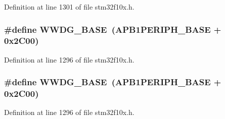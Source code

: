 Definition at line 1301 of file stm32f10x.\+h.

\subsubsection[{\texorpdfstring{W\+W\+D\+G\+\_\+\+B\+A\+SE}{WWDG_BASE}}]{\setlength{\rightskip}{0pt plus 5cm}\#define W\+W\+D\+G\+\_\+\+B\+A\+SE~({\bf A\+P\+B1\+P\+E\+R\+I\+P\+H\+\_\+\+B\+A\+SE} + 0x2\+C00)}\hypertarget{group___peripheral__memory__map_ga9a5bf4728ab93dea5b569f5b972cbe62}{}\label{group___peripheral__memory__map_ga9a5bf4728ab93dea5b569f5b972cbe62}


Definition at line 1296 of file stm32f10x.\+h.

\subsubsection[{\texorpdfstring{W\+W\+D\+G\+\_\+\+B\+A\+SE}{WWDG_BASE}}]{\setlength{\rightskip}{0pt plus 5cm}\#define W\+W\+D\+G\+\_\+\+B\+A\+SE~({\bf A\+P\+B1\+P\+E\+R\+I\+P\+H\+\_\+\+B\+A\+SE} + 0x2\+C00)}\hypertarget{group___peripheral__memory__map_ga9a5bf4728ab93dea5b569f5b972cbe62}{}\label{group___peripheral__memory__map_ga9a5bf4728ab93dea5b569f5b972cbe62}


Definition at line 1296 of file stm32f10x.\+h.

